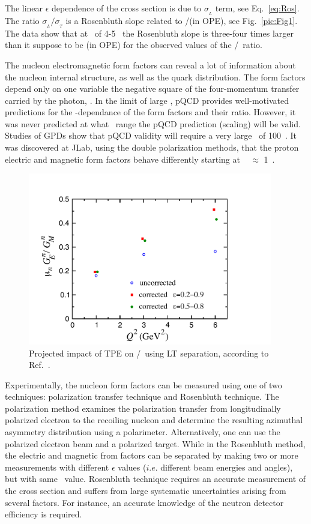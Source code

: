The linear $\epsilon$ dependence of the cross section is due to $\sigma_{_L}$ term, see Eq.~\ref{eq:Ros}.
The ratio $\sigma_{_L}/\sigma_{_T}$ is a Rosenbluth slope related to \gef/\gmf (in OPE), see Fig.~\ref{pic:Fig1}.
The data show that at \qsq~of 4-5 \gevcsq~the Rosenbluth slope is three-four times larger than it suppose to be (in OPE) for
the observed values of the \gep/\gmp~ratio.

%
The nucleon electromagnetic form factors can reveal a lot of information about the nucleon internal structure, as well as the quark distribution. 
The form factors depend only on one variable the negative square of the four-momentum transfer carried by the photon, \qsq. 
In the limit of large \qsq, pQCD provides well-motivated predictions for the \qsq-dependance of the form factors and their ratio. 
However, it was never predicted at what \qsq~range the pQCD prediction (scaling) will be valid.
Studies of GPDs show that pQCD validity will require a very large \qsq~of 100~\gevcsq. 
It was discovered at JLab, using the double polarization methods, that the proton electric and magnetic form factors behave differently starting at \qsq~ $\approx$ 1~\gevcsq.
 
\begin{figure}[th]
\includegraphics[width = 0.95\textwidth]{Plots/nTPE-BMT.pdf}
\caption{Projected impact of TPE on \gen/\gmn~using LT separation, according to Ref.~\cite{Blunden:2005ew}.}
\label{pic:Fig2}
\end{figure}
 
Experimentally, the nucleon form factors can be measured using one of two techniques: polarization transfer technique and Rosenbluth technique. 
The polarization method examines the polarization transfer from longitudinally polarized electron to the recoiling nucleon and 
determine the resulting azimuthal asymmetry distribution using a polarimeter. 
Alternatively, one can use the polarized  electron beam and a polarized target. 
While in the Rosenbluth method, the electric and magnetic from factors can be separated by making two or more measurements with 
different $\epsilon$ values ($i.e.$ different beam energies and angles), but with same \qsq~value. 
Rosenbluth technique requires an accurate measurement of the cross section and suffers from large systematic uncertainties arising from several factors. 
For instance, an accurate knowledge of the neutron detector efficiency is required.

